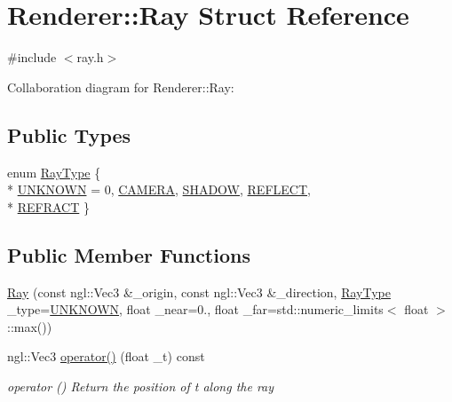 \hypertarget{structRenderer_1_1Ray}{}\section{Renderer\+:\+:Ray Struct Reference}
\label{structRenderer_1_1Ray}


{\ttfamily \#include $<$ray.\+h$>$}



Collaboration diagram for Renderer\+:\+:Ray\+:
\subsection*{Public Types}
\begin{DoxyCompactItemize}
\item 
enum \hyperlink{structRenderer_1_1Ray_a4722d2a722c51993edca2496027414df}{Ray\+Type} \{ \\*
\hyperlink{structRenderer_1_1Ray_a4722d2a722c51993edca2496027414dfa25ec2789fd632c336f09178ec9065b82}{U\+N\+K\+N\+O\+W\+N} = 0, 
\hyperlink{structRenderer_1_1Ray_a4722d2a722c51993edca2496027414dfa8aa5e7b13fe018ad7b45bec8271fb675}{C\+A\+M\+E\+R\+A}, 
\hyperlink{structRenderer_1_1Ray_a4722d2a722c51993edca2496027414dfa1470ae5ab6a64b0215827ed607f05807}{S\+H\+A\+D\+O\+W}, 
\hyperlink{structRenderer_1_1Ray_a4722d2a722c51993edca2496027414dfad976c070bfe94008c9ec8f64c62bb524}{R\+E\+F\+L\+E\+C\+T}, 
\\*
\hyperlink{structRenderer_1_1Ray_a4722d2a722c51993edca2496027414dfa699b8cebf03b418927cf54fd6ea917b8}{R\+E\+F\+R\+A\+C\+T}
 \}
\end{DoxyCompactItemize}
\subsection*{Public Member Functions}
\begin{DoxyCompactItemize}
\item 
\hyperlink{structRenderer_1_1Ray_a174d2a110f464b0715f689b9eb664cad}{Ray} (const ngl\+::\+Vec3 \&\+\_\+origin, const ngl\+::\+Vec3 \&\+\_\+direction, \hyperlink{structRenderer_1_1Ray_a4722d2a722c51993edca2496027414df}{Ray\+Type} \+\_\+type=\hyperlink{structRenderer_1_1Ray_a4722d2a722c51993edca2496027414dfa25ec2789fd632c336f09178ec9065b82}{U\+N\+K\+N\+O\+W\+N}, float \+\_\+near=0., float \+\_\+far=std\+::numeric\+\_\+limits$<$ float $>$\+::max())
\item 
ngl\+::\+Vec3 \hyperlink{structRenderer_1_1Ray_a7aadfb31ea40383058a79e02ddfe9fdc}{operator()} (float \+\_\+t) const 
\begin{DoxyCompactList}\small\item\em operator () Return the position of t along the ray \end{DoxyCompactList}\end{DoxyCompactItemize}
